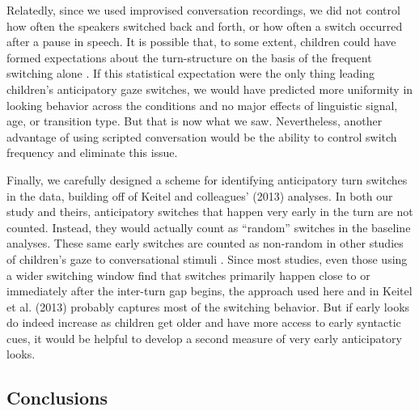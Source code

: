 \documentclass[authoryear, 12pt]{elsarticle}
\begin{document}
Relatedly, since we used improvised conversation recordings, we did not control how often the speakers switched back and forth, or how often a switch occurred after a pause in speech. It is possible that, to some extent, children could have formed expectations about the turn-structure on the basis of the frequent switching alone \citep[see, e.g., ][]{thorgrimssonUndRev}. If this statistical expectation were the only thing leading children's anticipatory gaze switches, we would have predicted more uniformity in looking behavior across the conditions and no major effects of linguistic signal, age, or transition type. But that is now what we saw. Nevertheless, another advantage of using scripted conversation would be the ability to control switch frequency and eliminate this issue. 

Finally, we carefully designed a scheme for identifying anticipatory turn switches in the data, building off of Keitel and colleagues' (2013) analyses. In both our study and theirs, anticipatory switches that happen very early in the turn are not counted. Instead, they would actually count as ``random'' switches in the baseline analyses. These same early switches are counted as non-random in other studies of children's gaze to conversational stimuli \citep{bakker2011, hofsten2009}. Since most studies, even those using a wider switching window \citep[e.g., ][]{hirvenkari2013} find that switches primarily happen close to or immediately after the inter-turn gap begins, the approach used here and in Keitel et al. (2013) probably captures most of the switching behavior. But if early looks do indeed increase as children get older and have more access to early syntactic cues, it would be helpful to develop a second measure of very early anticipatory looks.

\subsection{Conclusions}
\end{document}
